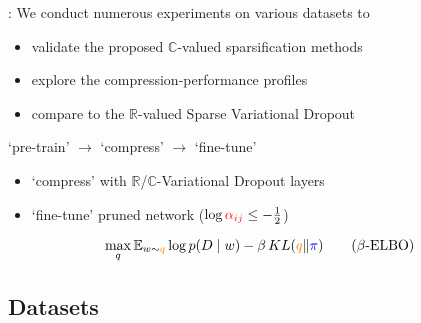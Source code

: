 \documentclass{beamer}
\newcommand{\real}{\mathbb{R}}
\newcommand{\cplx}{\mathbb{C}}
\begin{document}
\begin{frame}[c]{\insertsection: \insertsubsection}
  We conduct numerous experiments on various datasets to
  \begin{itemize}
    \item validate the proposed $\cplx$-valued sparsification methods
    \item explore the compression-performance profiles
    \item compare to the $\real$-valued Sparse Variational Dropout
  \end{itemize}

  \pause
  \bigskip
  `pre-train' $\to$ `compress' $\to$ `fine-tune'
  \begin{itemize}
    \item `compress' with $\real$/$\cplx$-Variational Dropout layers
    \item `fine-tune' pruned network ($
      \log{{\color{red} \alpha_{ij}}} \leq -\tfrac12
    $)
  \end{itemize}

  \pause
  \bigskip
  \begin{equation}  \label{eq:beta_elbo}
    \max_q
    \mathbb{E}_{w \sim {\color{orange} q}}
      \log p(D \mid w)  %
      - \beta \mathop{KL}({\color{orange} q}\|{\color{blue} \pi})
    \tag{$\beta$-ELBO}
  \end{equation}

\end{frame}


\subsection{Datasets} %
\label{sub:datasets}
\end{document}

